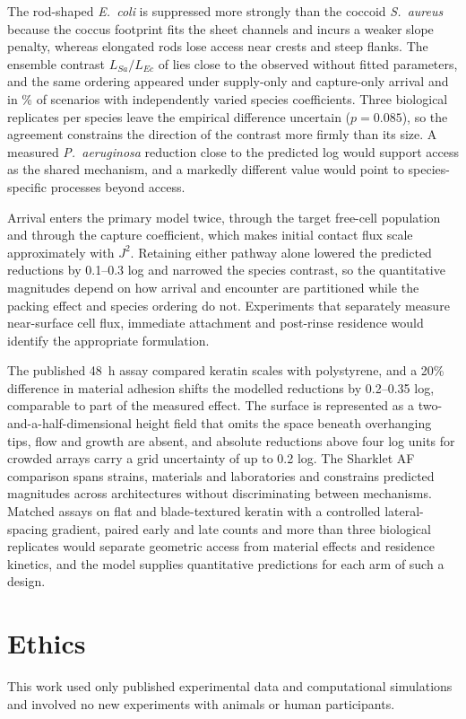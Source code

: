 \documentclass[11pt]{article}
\newcommand{\Ec}{\textit{E.~coli}}
\newcommand{\Sa}{\textit{S.~aureus}}
\newcommand{\Pa}{\textit{P.~aeruginosa}}
\begin{document}
The rod-shaped \Ec{} is suppressed more strongly than the coccoid \Sa{} because the coccus footprint fits the sheet channels and incurs a weaker slope penalty, whereas elongated rods lose access near crests and steep flanks. The ensemble contrast $L_{Sa}/L_{Ec}$ of \RhoModel{} lies close to the observed \RhoObsA{} without fitted parameters, and the same ordering appeared under supply-only and capture-only arrival and in \IndOrdPct{}\% of scenarios with independently varied species coefficients. Three biological replicates per species leave the empirical difference uncertain ($p=0.085$), so the agreement constrains the direction of the contrast more firmly than its size. A measured \Pa{} reduction close to the predicted \PredPa{} log would support access as the shared mechanism, and a markedly different value would point to species-specific processes beyond access.

Arrival enters the primary model twice, through the target free-cell population and through the capture coefficient, which makes initial contact flux scale approximately with $J^2$. Retaining either pathway alone lowered the predicted reductions by 0.1--0.3 log and narrowed the species contrast, so the quantitative magnitudes depend on how arrival and encounter are partitioned while the packing effect and species ordering do not. Experiments that separately measure near-surface cell flux, immediate attachment and post-rinse residence would identify the appropriate formulation.

The published 48~h assay compared keratin scales with polystyrene, and a 20\% difference in material adhesion shifts the modelled reductions by 0.2--0.35 log, comparable to part of the measured effect. The surface is represented as a two-and-a-half-dimensional height field that omits the space beneath overhanging tips, flow and growth are absent, and absolute reductions above four log units for crowded arrays carry a grid uncertainty of up to 0.2 log. The Sharklet AF comparison spans strains, materials and laboratories and constrains predicted magnitudes across architectures without discriminating between mechanisms. Matched assays on flat and blade-textured keratin with a controlled lateral-spacing gradient, paired early and late counts and more than three biological replicates would separate geometric access from material effects and residence kinetics, and the model supplies quantitative predictions for each arm of such a design.

\section*{Ethics}
This work used only published experimental data and computational simulations and involved no new experiments with animals or human participants.
\end{document}
